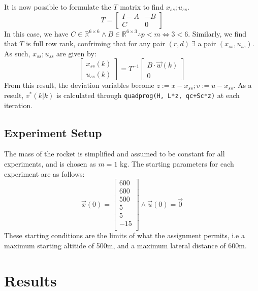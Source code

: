 \documentclass[conference, tikz]{IEEEtran}
\begin{document}
It is now possible to formulate the $T$ matrix to find $x_{ss};u_{ss}$.
\[
    T = 
    \begin{bmatrix}
        I-A & -B\\
        C & 0
    \end{bmatrix}
\]
In this case, we have $C \in \mathbb{R}^{6 \times 6} \land B \in \mathbb{R}^{6 \times 3} \therefore p < m \iff 3 < 6$.
Similarly, we find that $T$ is full row rank, confriming that for any pair $ (r, d) \ \exists$ a pair $(x_{ss}, u_{ss})$.
As such, $x_{ss};u_{ss}$ are given by:
\[
    \begin{bmatrix}
        x_{ss}(k)\\
        u_{ss}(k)
    \end{bmatrix}
    =
    T^{-1}
    \begin{bmatrix}
        B\cdot \vec w(k)\\

        0
    \end{bmatrix}
\]
From this result, the deviation variables become $ z := x - x_{ss}; v := u - x_{ss}$. 
As a result, $v^*(k|k)$ is calculated through \verb|quadprog(H, L*z, qc+Sc*z)| at each iteration.


\subsection{Experiment Setup}
The mass of the rocket is simplified and assumed to be constant for all experiments, and is chosen as $m = 1\text{ kg}$.
The starting parameters for each experiment are as follows:
\[
    \vec x(0)
        =
        \begin{bmatrix}
            600\\
            600\\
            500\\
            5\\
            5\\
            -15\\
        \end{bmatrix}
        \land
        \vec u(0)
        = \vec 0
\]
These starting conditions are the limits of what the assignment permits, i.e a maximum starting altitide of 500m, and a maximum lateral distance of 600m.

\pagebreak
\section{Results}
\end{document}
